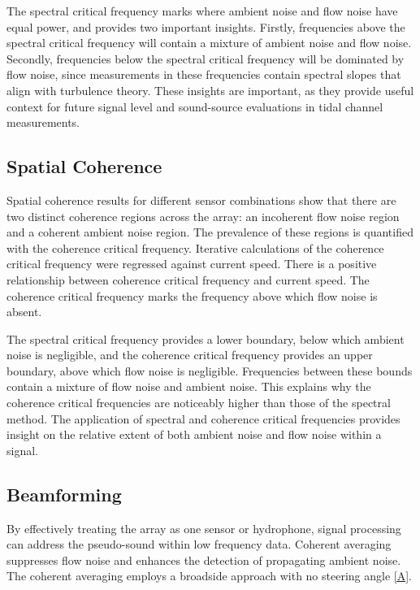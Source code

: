 \documentclass[12pt,journal,onecolumn]{IEEEtran}
\begin{document}
The spectral critical frequency marks where ambient noise and flow noise have equal power, and provides two important insights. Firstly, frequencies above the spectral critical frequency will contain a mixture of ambient noise and flow noise. Secondly, frequencies below the spectral critical frequency will be dominated by flow noise, since measurements in these frequencies contain spectral slopes that align with turbulence theory. These insights are important, as they provide useful context for future signal level and sound-source evaluations in tidal channel measurements. 



\subsection{Spatial Coherence}%
Spatial coherence results for different sensor combinations show that there are two distinct coherence regions across the array: an incoherent flow noise region and a coherent ambient noise region. The prevalence of these regions is quantified with the coherence critical frequency. %
Iterative calculations of the coherence critical frequency were regressed against current speed. There is a positive relationship between coherence critical frequency and current speed. The coherence critical frequency marks the frequency above which flow noise is absent. %

The spectral critical frequency provides a lower boundary, below which ambient noise is negligible, and the coherence critical frequency provides an upper boundary, above which flow noise is negligible. Frequencies between these bounds contain a mixture of flow noise and ambient noise. This explains why the coherence critical frequencies are noticeably higher than those of the spectral method. The application of spectral and coherence critical frequencies provides insight on the relative extent of both ambient noise and flow noise within a signal. 



\subsection{Beamforming}
 By effectively treating the array as one sensor or hydrophone, signal processing can address the pseudo-sound within low frequency data. %
Coherent averaging suppresses flow noise and enhances the detection of propagating ambient noise. The coherent averaging employs a broadside approach with no steering angle \eqref{A}. 
\end{document}

